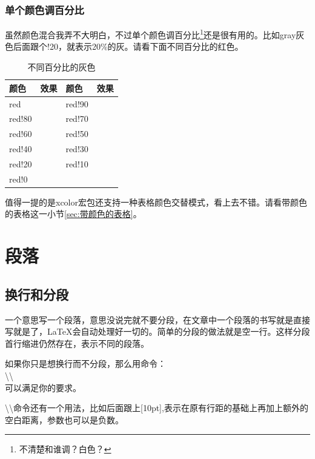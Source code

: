 \documentclass[12pt,oneside]{book}
\begin{document}
\begin{common-format}
\subsubsection{单个颜色调百分比}
虽然颜色混合我弄不大明白，不过单个颜色调百分比\footnote{不清楚和谁调？白色？}还是很有用的。比如gray灰色后面跟个!20，就表示20\%的灰。请看下面不同百分比的红色。
\begin{table}[H]
\centering
\begin{tabular}{@{}lp{50pt}lp{50pt}@{}}
\toprule
颜色        & 效果  & 颜色       & 效果\\ \midrule
red     &  \cellcolor{red}  & red!90     &    \cellcolor{red!90} \\
red!80      &   \cellcolor{red!80} & red!70    &   \cellcolor{red!70}\\
red!60     &  \cellcolor{red!60}  & red!50      &   \cellcolor{red!50}\\
red!40      &   \cellcolor{red!40} & red!30    &   \cellcolor{red!30}\\
red!20  &  \cellcolor{red!20} &red!10       &   \cellcolor{red!10}  \\
red!0    &    \cellcolor{red!0}\\ \bottomrule
\end{tabular}
\label{tab:不同百分比的灰色}
\caption{不同百分比的灰色}
\end{table}


值得一提的是xcolor宏包还支持一种表格颜色交替模式，看上去不错。请看带颜色的表格这一小节\ref{sec:带颜色的表格}。



\section{段落}
\subsection{换行和分段}
一个意思写一个段落，意思没说完就不要分段，在文章中一个段落的书写就是直接写就是了，\LaTeX 会自动处理好一切的。简单的分段的做法就是空一行。这样分段首行缩进仍然存在，表示不同的段落。

如果你只是想换行而不分段，那么用命令：\\
\textbackslash \textbackslash \\
可以满足你的要求。

\textbackslash \textbackslash 命令还有一个用法，比如后面跟上[10pt],表示在原有行距的基础上再加上额外的空白距离，参数也可以是负数。


\end{common-format}
\end{document}
